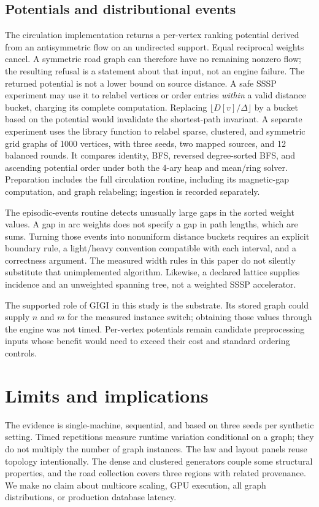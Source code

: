 \documentclass[11pt]{article}
\begin{document}
\subsection{Potentials and distributional events}
The circulation implementation returns a per-vertex ranking potential derived
from an antisymmetric flow on an undirected support. Equal reciprocal weights
cancel. A symmetric road graph can therefore have no remaining nonzero flow;
the resulting refusal is a statement about that input, not an engine failure.
The returned potential is not a lower bound on source distance. A safe SSSP
experiment may use it to relabel vertices or order entries \emph{within} a valid
distance bucket, charging its complete computation. Replacing
$\lfloor D[v]/\Delta\rfloor$ by a bucket based on the potential would invalidate
the shortest-path invariant. A separate experiment uses the library function to
relabel sparse, clustered, and symmetric grid graphs of 1000 vertices, with three
seeds, two mapped sources, and 12 balanced rounds. It compares identity, BFS,
reversed degree-sorted BFS, and ascending potential order under both the 4-ary
heap and mean/ring solver. Preparation includes the full circulation routine,
including its magnetic-gap computation, and graph relabeling; ingestion is
recorded separately. 

The episodic-events routine detects unusually large gaps in the sorted weight
values. A gap in arc weights does not specify a gap in path lengths, which are
sums. Turning those events into nonuniform distance buckets requires an explicit
boundary rule, a light/heavy convention compatible with each interval, and a
correctness argument. The measured width rules in this paper do not silently
substitute that unimplemented algorithm. Likewise, a declared lattice supplies
incidence and an unweighted spanning tree, not a weighted SSSP accelerator.

The supported role of GIGI in this study is the substrate. Its stored graph
could supply $n$ and $m$ for the measured instance switch; obtaining those values
through the engine was not timed. Per-vertex potentials remain candidate preprocessing inputs
whose benefit would need to exceed their cost and standard ordering controls.

\section{Limits and implications}
The evidence is single-machine, sequential, and based on three seeds per
synthetic setting. Timed repetitions measure runtime variation conditional on a
graph; they do not multiply the number of graph instances. The law and layout
panels reuse topology intentionally. The dense and clustered generators couple
some structural properties, and the road collection covers three regions with
related provenance. We make no claim about multicore scaling, GPU execution,
all graph distributions, or production database latency.
\end{document}
